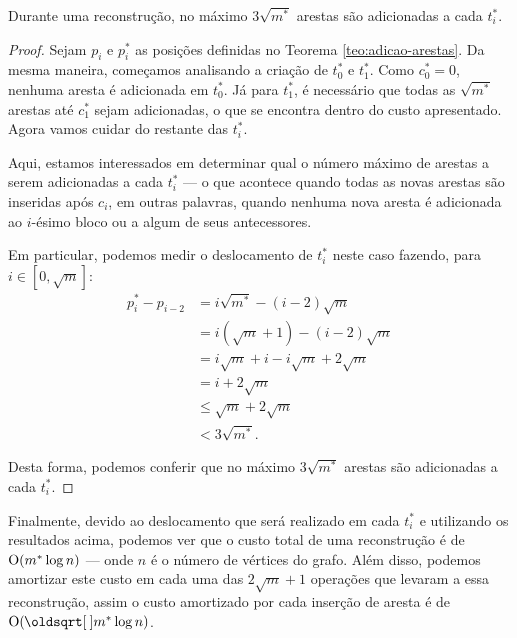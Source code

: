 \begin{theorem}
    \label{teo:deslocamento}
    Durante uma reconstrução, no máximo $3 \sqrt{m^*}$ arestas são adicionadas a cada $t_i^*$.
\end{theorem}
\begin{proof}
    Sejam $p_i$ e $p_i^*$ as posições definidas no Teorema \ref{teo:adicao-arestas}. Da mesma maneira, começamos analisando a criação de $t_0^*$ e $t_1^*$. Como $c_0^* = 0$, nenhuma aresta é adicionada em $t_0^*$. Já para $t_1^*$, é necessário que todas as $\sqrt{m^*}$ arestas até $c_1^*$ sejam adicionadas, o que se encontra dentro do custo apresentado. Agora vamos cuidar do restante das $t_i^*$.

    Aqui, estamos interessados em determinar qual o número máximo de arestas a serem adicionadas a cada $t_i^*$ --- o que acontece quando todas as novas arestas são inseridas após $c_i$, em outras palavras, quando nenhuma nova aresta é adicionada ao $i$-ésimo bloco ou a algum de seus antecessores.

    Em particular, podemos medir o deslocamento de $t_i^*$ neste caso fazendo, para $i \in [0, \sqrt{m}]$:
    \begin{align*}
        p_i^* - p_{i-2} & = i\sqrt{m^*} - (i-2)\sqrt{m}           \\
                        & = i(\sqrt{m}+1) - (i-2)\sqrt{m}         \\
                        & = i\sqrt{m} + i - i\sqrt{m} + 2\sqrt{m} \\
                        & = i + 2\sqrt{m}                         \\
                        & \leq \sqrt{m} + 2\sqrt{m}               \\
                        & < 3\sqrt{m^*}.
    \end{align*}

    Desta forma, podemos conferir que no máximo $3 \sqrt{m^*}$ arestas são adicionadas a cada $t_i^*$.
\end{proof}

Finalmente, devido ao deslocamento que será realizado em cada $t_i^*$ e utilizando os resultados acima, podemos ver que o custo total de uma reconstrução é de $\mathrm{O}(m^* \log{n})$ --- onde $n$ é o número de vértices do grafo. Além disso, podemos amortizar este custo em cada uma das $2\sqrt{m} + 1$ operações que levaram a essa reconstrução, assim o custo amortizado por cada inserção de aresta é de $\Oh(\sqrt{m^*} \log{n})$.

